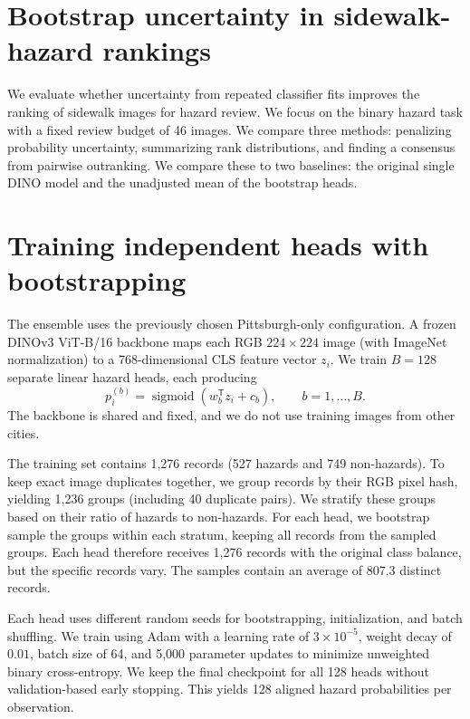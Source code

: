 \documentclass[10pt,a4paper]{article}
\begin{document}
\section*{Bootstrap uncertainty in sidewalk-hazard rankings}

We evaluate whether uncertainty from repeated classifier fits improves the ranking of sidewalk images for hazard review. We focus on the binary hazard task with a fixed review budget of 46 images. We compare three methods: penalizing probability uncertainty, summarizing rank distributions, and finding a consensus from pairwise outranking. We compare these to two baselines: the original single DINO model and the unadjusted mean of the bootstrap heads.

\section{Training independent heads with bootstrapping}
\label{sec:training}
The ensemble uses the previously chosen Pittsburgh-only configuration. A frozen DINOv3 ViT-B/16 backbone maps each RGB $224\times224$ image (with ImageNet normalization) to a 768-dimensional CLS feature vector $z_i$. We train $B=128$ separate linear hazard heads, each producing
\begin{equation}
p_i^{(b)}=\operatorname{sigmoid}\!\left(w_b^{\mathsf T}z_i+c_b\right),
\qquad b=1,\ldots,B.
\end{equation}
The backbone is shared and fixed, and we do not use training images from other cities.

The training set contains 1,276 records (527 hazards and 749 non-hazards). To keep exact image duplicates together, we group records by their RGB pixel hash, yielding 1,236 groups (including 40 duplicate pairs). We stratify these groups based on their ratio of hazards to non-hazards. For each head, we bootstrap sample the groups within each stratum, keeping all records from the sampled groups. Each head therefore receives 1,276 records with the original class balance, but the specific records vary. The samples contain an average of 807.3 distinct records.

Each head uses different random seeds for bootstrapping, initialization, and batch shuffling. We train using Adam with a learning rate of $3\times10^{-5}$, weight decay of $0.01$, batch size of 64, and 5,000 parameter updates to minimize unweighted binary cross-entropy. We keep the final checkpoint for all 128 heads without validation-based early stopping. This yields 128 aligned hazard probabilities per observation.
\end{document}
